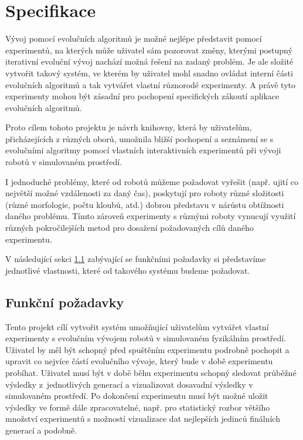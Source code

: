 \chapter{Specifikace} \label{chapter-specifikace}

Vývoj pomocí evolučních algoritmů je možné nejlépe představit pomocí
experimentů, na kterých může uživatel sám pozorovat změny, kterými postupný
iterativní evoluční vývoj nachází možná řešení na zadaný problém. Je ale
složité vytvořit takový systém, ve kterém by uživatel mohl snadno ovládat
interní části evolučních algoritmů a tak vytvářet vlastní různorodé
experimenty. A právě tyto experimenty mohou být zásadní pro pochopení
specifických zákoutí aplikace evolučních algoritmů.

Proto cílem tohoto projektu je návrh knihovny, která by uživatelům,
přicházejících z různých oborů, umožnila bližší pochopení a seznámení se s
evolučními algoritmy pomocí vlastních interaktivních experimentů při vývoji
robotů v simulovaném prostředí. 

I jednoduché problémy, které od robotů můžeme požadovat vyřešit (např. ujití co
největší možné vzdálenosti za daný čas), poskytují pro roboty různé složitosti
(různé morfologie, počtu kloubů, atd.) dobrou představu v nárůstu obtížnosti
daného problému. Tímto zároveň experimenty s různými roboty vynucují využití
různých pokročilejších metod pro dosažení požadovaných cílů daného experimentu.

V následující sekci \ref{Specifikace-funkčnípožadavky} zabývající se funkčními
požadavky si představíme jednotlivé vlastnosti, které od takového systému
budeme požadovat.

\section{Funkční požadavky} \label{Specifikace-funkčnípožadavky}

Tento projekt cílí vytvořit systém umožňující uživatelům vytvářet vlastní
experimenty s evolučním vývojem robotů v simulovaném fyzikálním prostředí.
Uživatel by měl být schopný před spuštěním experimentu podrobně pochopit a
upravit co nejvíce částí evolučního vývoje, který bude v době experimentu
probíhat. Uživatel musí být v době běhu experimentu schopný sledovat průběžné
výsledky z~jednotlivých generací a vizualizovat dosavadní výsledky v
simulovaném prostředí. Po dokončení experimentu musí být možné uložit
výsledky ve formě dále zpracovatelné, např. pro statistický rozbor většího
množství experimentů s možností vizualizace dat nejlepších jedinců finálních
generací a podobně.

